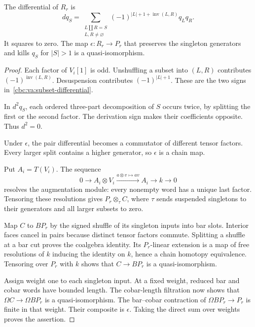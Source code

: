 \begin{theorem}\label{cbc:va:subset-resolution}
The differential of $R_r$ is
\begin{equation}\label{cbc:va:subset-differential}
 dq_S=\sum_{\substack{L\amalg R=S\\L,R\ne\varnothing}}
       (-1)^{|L|+1+\operatorname{inv}(L,R)}q_Lq_R.
\end{equation}
It squares to zero. The map
$\epsilon:R_r\to P_r$ that preserves the singleton
generators and kills $q_S$ for $|S|>1$ is a
quasi-isomorphism.
\end{theorem}
\begin{proof}
Each factor of $V_i[1]$ is odd. Unshuffling a subset
into $(L,R)$ contributes
$(-1)^{\operatorname{inv}(L,R)}$. Desuspension
contributes $(-1)^{|L|+1}$. These are the two signs
in~\eqref{cbc:va:subset-differential}.

In $d^2q_S$, each ordered three-part decomposition
of $S$ occurs twice, by splitting the first or the
second factor. The derivation sign makes their
coefficients opposite. Thus $d^2=0$.

Under $\epsilon$, the pair differential becomes a
commutator of different tensor factors. Every
larger split contains a higher generator, so
$\epsilon$ is a chain map.

Put $A_i=T(V_i)$. The sequence
\[
 0\longrightarrow A_i\otimes V_i
 \xrightarrow{a\otimes v\mapsto av}A_i
 \longrightarrow k\longrightarrow0
\]
resolves the augmentation module: every nonempty
word has a unique last factor. Tensoring these
resolutions gives $P_r\otimes_\tau C$, where
$\tau$ sends suspended singletons to their
generators and all larger subsets to zero.

Map $C$ to $BP_r$ by the signed shuffle of its
singleton inputs into bar slots. Interior faces
cancel in pairs because distinct tensor factors
commute. Splitting a shuffle at a bar cut proves
the coalgebra identity. Its $P_r$-linear extension
is a map of free resolutions of $k$ inducing the
identity on $k$, hence a chain homotopy equivalence.
Tensoring over $P_r$ with $k$ shows that
$C\to BP_r$ is a quasi-isomorphism.

Assign weight one to each singleton input.
At a fixed weight, reduced bar and cobar words have
bounded length. The cobar-length filtration now
shows that $\Omega C\to\Omega BP_r$ is a
quasi-isomorphism. The bar--cobar contraction of
$\Omega BP_r\to P_r$ is finite in that weight.
Their composite is $\epsilon$. Taking the direct
sum over weights proves the assertion.
\end{proof}

